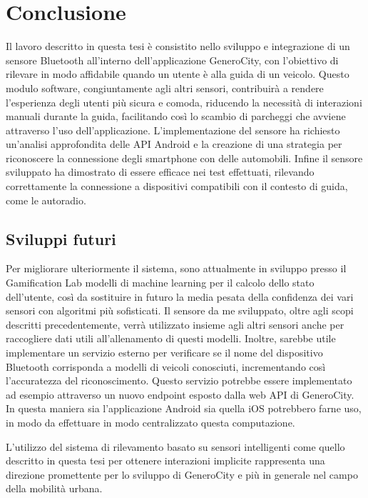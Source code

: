 \chapter{Conclusione}
Il lavoro descritto in questa tesi è consistito nello sviluppo e integrazione di un sensore Bluetooth all'interno dell'applicazione GeneroCity, con l'obiettivo di rilevare in modo affidabile quando un utente è alla guida di un veicolo. Questo modulo software, congiuntamente agli altri sensori, contribuirà a rendere l'esperienza degli utenti più sicura e comoda, riducendo la necessità di interazioni manuali durante la guida, facilitando così lo scambio di parcheggi che avviene attraverso l'uso dell'applicazione. L'implementazione del sensore ha richiesto un'analisi approfondita delle API Android e la creazione di una strategia per riconoscere la connessione degli smartphone con delle automobili. Infine il sensore sviluppato ha dimostrato di essere efficace nei test effettuati, rilevando correttamente la connessione a dispositivi compatibili con il contesto di guida, come le autoradio.


\section{Sviluppi futuri}
Per migliorare ulteriormente il sistema, sono attualmente in sviluppo presso il Gamification Lab modelli di machine learning per il calcolo dello stato dell'utente, così da sostituire in futuro la media pesata della confidenza dei vari sensori con algoritmi più sofisticati. Il sensore da me sviluppato, oltre agli scopi descritti precedentemente, verrà utilizzato insieme agli altri sensori anche per raccogliere dati utili all'allenamento di questi modelli. Inoltre, sarebbe utile implementare un servizio esterno per verificare se il nome del dispositivo Bluetooth corrisponda a modelli di veicoli conosciuti, incrementando così l'accuratezza del riconoscimento. Questo servizio potrebbe essere implementato ad esempio attraverso un nuovo endpoint esposto dalla web API di GeneroCity. In questa maniera sia l'applicazione Android sia quella iOS potrebbero farne uso, in modo da effettuare in modo centralizzato questa computazione.

L'utilizzo del sistema di rilevamento basato su sensori intelligenti come quello descritto in questa tesi per ottenere interazioni implicite rappresenta una direzione promettente per lo sviluppo di GeneroCity e più in generale nel campo della mobilità urbana.

